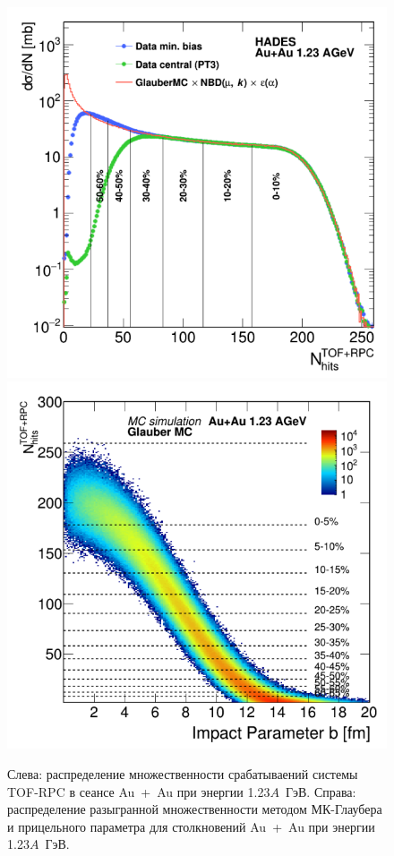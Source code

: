 \begin{figure}[ht]
\begin{center}
    \includegraphics[width=0.45\linewidth]{images/mc_glauber_auau_mult.png}
    \includegraphics[width=0.45\linewidth]{images/mc_glauber_auau_b_mult.png}
    \caption{Слева: распределение множественности срабатываений системы TOF-RPC в сеансе Au~+~Au при энергии 1.23$A$~ГэВ. Справа: распределение разыгранной множественности методом МК-Глаубера и прицельного параметра для столкновений Au~+~Au при энергии 1.23$A$~ГэВ.}
    \label{fig:mc_glauber_auau}
\end{center}
\end{figure}

